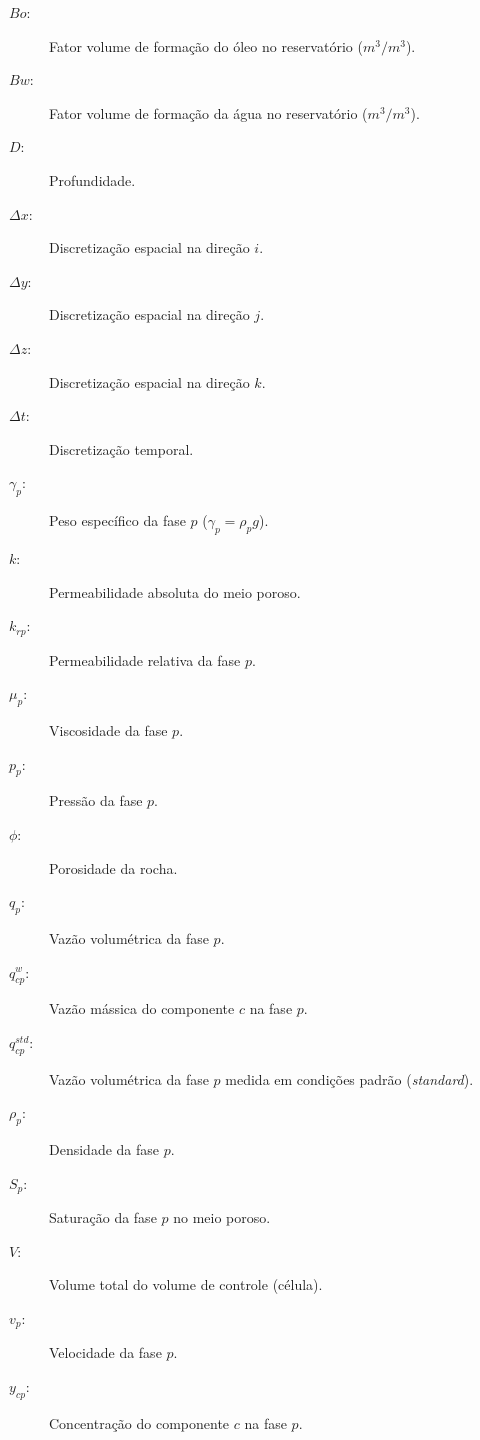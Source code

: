 \documentclass[final,5p]{elsarticle}
\numberwithin{equation}{section}
\begin{document}
\begin{description}
    \item[$Bo$:]Fator volume de formação do óleo no reservatório ($m^3/m^3$).
    \item[$Bw$:]Fator volume de formação da água no reservatório ($m^3/m^3$).
    \item[$D$:]Profundidade.
    \item[$\Delta x$:]Discretização espacial na direção $i$.
    \item[$\Delta y$:]Discretização espacial na direção $j$.
    \item[$\Delta z$:]Discretização espacial na direção $k$.
    \item[$\Delta t$:]Discretização temporal.
    \item[$\gamma_p$:]Peso específico da fase $p$ ($\gamma_p = \rho_p g$).
    \item[$k$:]Permeabilidade absoluta do meio poroso.
    \item[$k_{rp}$:]Permeabilidade relativa da fase $p$.
    \item[$\mu_p$:]Viscosidade da fase $p$.
    \item[$p_p$:]Pressão da fase $p$.
    \item[$\phi$:]Porosidade da rocha.
    \item[$q_p$:]Vazão volumétrica da fase $p$.
    \item[$q^w_{cp}$:]Vazão mássica do componente $c$ na fase $p$.
    \item[$q^{std}_{cp}$:]Vazão volumétrica da fase $p$ medida em condições padrão (\emph{standard}).
    \item[$\rho_p$:]Densidade da fase $p$.
    \item[$S_p$:]Saturação da fase $p$ no meio poroso.
    \item[$V$:]Volume total do volume de controle (célula).
    \item[$v_p$:]Velocidade da fase $p$.
    \item[$y_{cp}$:]Concentração do componente $c$ na fase $p$.
\end{description}





\end{document}
